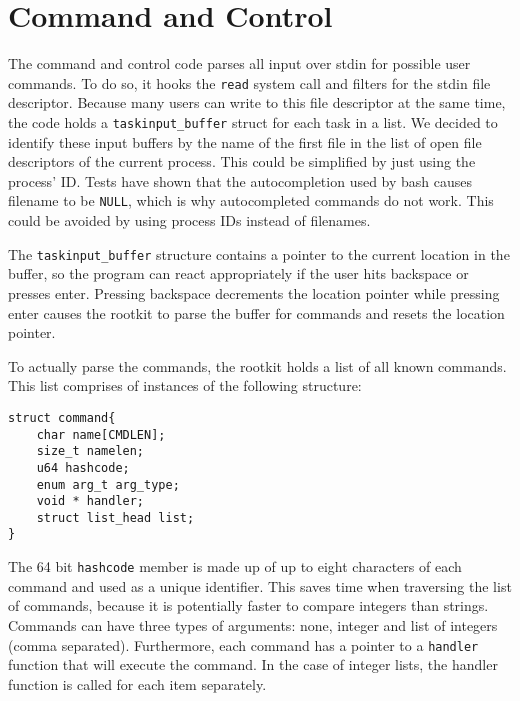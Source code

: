 \section{Command and Control}
The command and control code parses all input over stdin for possible user 
commands. To do so, it hooks the \texttt{read} system call and filters for the 
stdin file descriptor. Because many users can write to this file descriptor at 
the same time, the code holds a \verb+taskinput_buffer+ struct for each task in 
a list. We decided to identify these input buffers by the name of the first 
file in the list of open file descriptors of the current process. 
This could be simplified by just using the process' ID.
Tests have shown that the autocompletion used by bash causes filename to be 
\texttt{NULL}, which is why autocompleted commands do not work. This could be 
avoided by using process IDs instead of filenames.\par
The \verb+taskinput_buffer+ structure contains a pointer to the current 
location 
in the buffer, so the program can react appropriately if the user hits 
backspace or presses enter. Pressing backspace decrements the location pointer 
while pressing enter causes the rootkit to parse the buffer for commands and 
resets the location pointer.\par
To actually parse the commands, the rootkit holds a list of all known commands. 
This list comprises of instances of the following structure:
\lstset{escapechar=,style=customc}
\begin{lstlisting}
struct command{
	char name[CMDLEN];
	size_t namelen;
	u64 hashcode;
	enum arg_t arg_type;
	void * handler;
	struct list_head list;
}
\end{lstlisting}
The 64 bit \texttt{hashcode} member is made up of up to eight characters of 
each command and used as a unique identifier. This saves time when traversing 
the list of commands, because it is potentially faster to compare integers than 
strings. Commands can have three types of arguments: none, integer and list of 
integers (comma separated).
Furthermore, each command has a pointer to a \texttt{handler} function that 
will 
execute the command. In the case of integer lists, the handler function is 
called for each item separately. 
